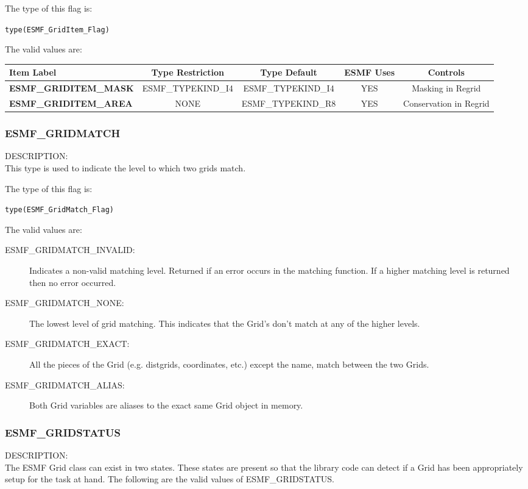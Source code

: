 The type of this flag is:

{\tt type(ESMF\_GridItem\_Flag)}

The valid values are:
\newline
\begin{tabular}{|l|c|c|c|c||}
\hline
\hline
Item Label & {\bf Type Restriction}  & {\bf Type Default} & {\bf ESMF Uses} & {\bf Controls} \\
\hline
{\bf ESMF\_GRIDITEM\_MASK}  & ESMF\_TYPEKIND\_I4 & ESMF\_TYPEKIND\_I4 & YES & Masking in Regrid \\
{\bf ESMF\_GRIDITEM\_AREA} & NONE & ESMF\_TYPEKIND\_R8 & YES & Conservation in Regrid \\
\hline
\hline
\end{tabular}


\subsubsection{ESMF\_GRIDMATCH}
\label{const:gridmatch}

{\sf DESCRIPTION:\\}
 This type is used to indicate the level to which two grids match.

The type of this flag is:

{\tt type(ESMF\_GridMatch\_Flag)}

The valid values are:
\begin{description}
\item [ESMF\_GRIDMATCH\_INVALID:] Indicates a non-valid matching level. Returned
      if an error occurs in the matching function. If a higher matching level
      is returned then no error occurred.
\item [ESMF\_GRIDMATCH\_NONE:] The lowest level of grid matching. 
      This indicates that the Grid's don't match at any of the higher levels. 
\item [ESMF\_GRIDMATCH\_EXACT:] All the pieces of the Grid (e.g. distgrids, 
      coordinates, etc.) except the name, match between the two Grids. 
\item [ESMF\_GRIDMATCH\_ALIAS:] Both Grid variables are aliases to the exact
      same Grid object in memory. 
\end{description}


\subsubsection{ESMF\_GRIDSTATUS}
\label{const:gridstatus}

{\sf DESCRIPTION:\\}
The ESMF Grid class can exist in two states. These states are
present so that the library code can detect if a Grid has been
appropriately setup for the task at hand. The following
are the valid values of ESMF\_GRIDSTATUS.

